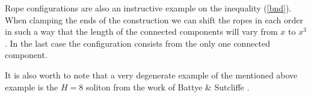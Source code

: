 \documentclass[a4paper,12pt]{article}
\begin{document}
	Rope configurations are also an instructive example on the
	inequality 
(\ref{bnd}).
	When clamping the ends of the construction we can shift
	the ropes in each order in such a way that the length
	of the connected components will vary from
    $ x $
	to 
    $ x^{3} $.
	In the last case the configuration consists from the only
	one connected component.

	It is also worth to note that a very degenerate example of 
	the mentioned above example is the
    $ H=8 $ 
	soliton from the work of Battye \& Sutcliffe
\cite{BS}.
\end{document}
